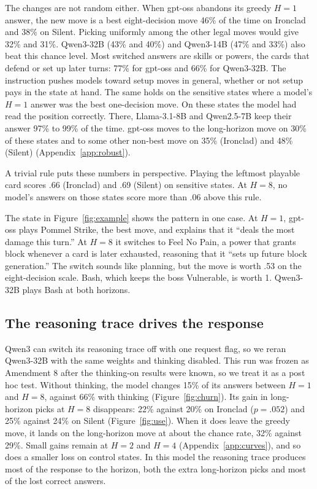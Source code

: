 The changes are not random either. When gpt-oss abandons its greedy $H{=}1$ answer, the new move is a best eight-decision move 46\% of the time on Ironclad and 38\% on Silent. Picking uniformly among the other legal moves would give 32\% and 31\%. Qwen3-32B (43\% and 40\%) and Qwen3-14B (47\% and 33\%) also beat this chance level. Most switched answers are skills or powers, the cards that defend or set up later turns: 77\% for gpt-oss and 66\% for Qwen3-32B. The instruction pushes models toward setup moves in general, whether or not setup pays in the state at hand. The same holds on the sensitive states where a model's $H{=}1$ answer was the best one-decision move. On these states the model had read the position correctly. There, Llama-3.1-8B and Qwen2.5-7B keep their answer 97\% to 99\% of the time. gpt-oss moves to the long-horizon move on 30\% of these states and to some other non-best move on 35\% (Ironclad) and 48\% (Silent) (Appendix~\ref{app:robust}).

A trivial rule puts these numbers in perspective. Playing the leftmost playable card scores .66 (Ironclad) and .69 (Silent) on sensitive states. At $H{=}8$, no model's answers on those states score more than .06 above this rule.

The state in Figure~\ref{fig:example} shows the pattern in one case. At $H{=}1$, gpt-oss plays Pommel Strike, the best move, and explains that it ``deals the most damage this turn.'' At $H{=}8$ it switches to Feel No Pain, a power that grants block whenever a card is later exhausted, reasoning that it ``sets up future block generation.'' The switch sounds like planning, but the move is worth .53 on the eight-decision scale. Bash, which keeps the boss Vulnerable, is worth 1. Qwen3-32B plays Bash at both horizons.

\subsection{The reasoning trace drives the response}

Qwen3 can switch its reasoning trace off with one request flag, so we reran Qwen3-32B with the same weights and thinking disabled. This run was frozen as Amendment 8 after the thinking-on results were known, so we treat it as a post hoc test. Without thinking, the model changes 15\% of its answers between $H{=}1$ and $H{=}8$, against 66\% with thinking (Figure~\ref{fig:churn}). Its gain in long-horizon picks at $H{=}8$ disappears: 22\% against 20\% on Ironclad ($p=.052$) and 25\% against 24\% on Silent (Figure~\ref{fig:use}). When it does leave the greedy move, it lands on the long-horizon move at about the chance rate, 32\% against 29\%. Small gains remain at $H{=}2$ and $H{=}4$ (Appendix~\ref{app:curves}), and so does a smaller loss on control states. In this model the reasoning trace produces most of the response to the horizon, both the extra long-horizon picks and most of the lost correct answers.

